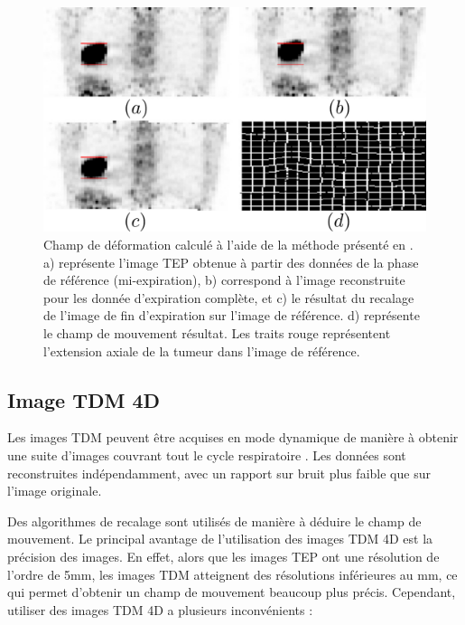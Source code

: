 \begin{figure}[h!]
	\begin{center}
		\includegraphics[width=12cm]{images/champDeformBai2}
	\end{center}
	\caption{Champ de déformation calculé à l'aide de la méthode présenté en \cite{bai2009regularized}. a) représente l'image TEP obtenue à partir des données de la phase de référence  (mi-expiration), b) correspond à l'image reconstruite pour les donnée d'expiration complète, et c) le résultat du recalage de l'image de fin d'expiration sur l'image de référence. d) représente le champ de mouvement résultat. Les traits rouge représentent l'extension axiale de la tumeur dans l'image de référence.} 
	\label{fig:champMouvementBai}
\end{figure}

\subsection{Image TDM 4D}

Les images TDM peuvent être acquises en mode dynamique de manière à obtenir une suite d'images couvrant tout le cycle respiratoire \cite{lamare2007list, qiao2006motion}. Les données sont reconstruites indépendamment, avec un rapport sur bruit plus faible que sur l'image originale. 

Des algorithmes de recalage sont utilisés de manière à déduire le champ de mouvement. Le principal avantage de l'utilisation des images TDM 4D est la précision des images. En effet, alors que les images TEP ont une résolution de l'ordre de 5mm, les images TDM atteignent des résolutions inférieures au mm, ce qui permet d'obtenir un champ de mouvement beaucoup plus précis. Cependant, utiliser des images TDM 4D a plusieurs inconvénients :

